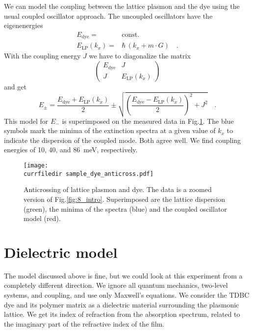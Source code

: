   We can model the coupling between the lattice plasmon and the dye using the usual coupled oscillator approach. The uncoupled oscillators have the eigenenergies
\begin{align}
  E_\text{dye} = &  \text{const.} \\
  E_\text{LP}(k_x) = &  \hbar  \, \left(  k_x + m \cdot G \right) \quad .
\end{align}
With the coupling energy $J$ we have to diagonalize the matrix
\begin{equation}
  \begin{pmatrix}
    E_\text{dye} & J \\
    J & E_\text{LP}(k_x) 
  \end{pmatrix}
\end{equation}
and get
\begin{equation}
  E_\pm = \frac{E_\text{dye}  +E_\text{LP}(k_x)}{2}  \pm \sqrt{ \left( \frac{E_\text{dye} - E_\text{LP}(k_x)}{2} \right)^2 + J^2 } \quad .
\end{equation}
This model for $E_-$ is superimposed on the measured data in Fig.\ref{fig:8_sample_dye_anticross}. The blue symbols mark the minima of the extinction spectra at a given value of $k_x$ to indicate the dispersion of the coupled mode. Both agree well. We find coupling energies of 10, 40, and 86~meV, respectively.

  \begin{figure}
    \texttt{[image: \\currfiledir sample\_dye\_anticross.pdf]}
    \caption{Anticrossing of lattice plasmon and dye. The data is a zoomed version of Fig.\ref{fig:8_intro}. Superimposed are the lattice dispersion (green), the minima of the spectra (blue) and the coupled oscillator model (red). \label{fig:8_sample_dye_anticross} }
  \end{figure}
    

\section{Dielectric model}

The model discussed above is fine, but we could look at this experiment from a completely different direction. We ignore all quantum mechanics, two-level systems, and coupling, and use only Maxwell's equations. We consider the TDBC dye and its polymer matrix as a dielectric material surrounding the plasmonic lattice. We get its index of refraction from the absorption spectrum, related to the imaginary part of the refractive index of the film. 

